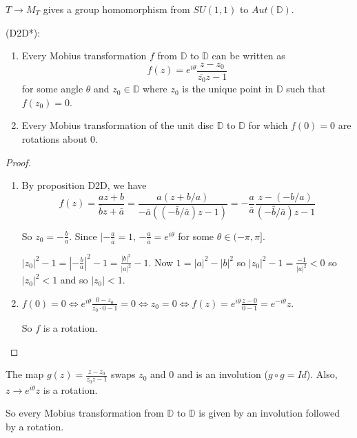 \begin{remark}
	$T \rightarrow M_T$ gives a group homomorphism from $SU(1, 1)$ to $Aut(\mathbb{D})$.
\end{remark}

\begin{corollary}
	(D2D*):
	\begin{enumerate}
		\item Every Mobius transformation $f$ from $\mathbb{D}$ to $\mathbb{D}$ can be written as
		\[f(z) = e^{i\theta} \frac{z - z_0}{\bar{z_0}z - 1}\]
		for some angle $\theta$ and $z_0 \in \mathbb{D}$ where $z_0$ is the unique point in $\mathbb{D}$ such that $f(z_0) = 0$.
		\item Every Mobius transformation of the unit disc $\mathbb{D}$ to $\mathbb{D}$ for which $f(0) = 0$ are rotations about $0$.
	\end{enumerate}
\end{corollary}

\begin{proof}
	\begin{enumerate}
		\item By proposition D2D, we have
		\[f(z) = \frac{az + b}{\bar{b}z + \bar{a}} = \frac{a(z + b / a)}{-\bar{a}((-\bar{b} / \bar{a}) z - 1)} = -\frac{a}{\bar{a}} \frac{z - (-b / a)}{(-\bar{b} / \bar{a}) z - 1}\]

		So $z_0 = -\frac{b}{a}$. Since $|-\frac{a}{\hat{a}} = 1$, $-\frac{a}{\hat{a}} = e^{i\theta}$ for some $\theta \in (-\pi, \pi]$.

		$|z_0|^2 - 1 = |-\frac{b}{a}|^2 - 1 = \frac{|b|^2}{|a|^2} - 1$. Now $1 = |a|^2 - |b|^2$ so $|z_0|^2 - 1 = \frac{-1}{|a|^2} < 0$ so $|z_0|^2 < 1$ and so $|z_0| < 1$.
		\item $f(0) = 0 \Leftrightarrow e^{i\theta} \frac{0 - z_0}{\bar{z_0}\cdot 0 - 1} = 0 \Leftrightarrow z_0 = 0 \Leftrightarrow f(z) = e^{i\theta}\frac{z - 0}{0 - 1} = e^{-i\theta}z$.
		
		So $f$ is a rotation.
	\end{enumerate}
\end{proof}

\begin{remark}
	The map $g(z) = \frac{z - z_0}{\bar{z_0}z - 1}$ swaps $z_0$ and $0$ and is an involution ($g \circ g = Id$). Also, $z \rightarrow e^{i\theta}z$ is a rotation.

	So every Mobius transformation from $\mathbb{D}$ to $\mathbb{D}$ is given by an involution followed by a rotation.
\end{remark}

